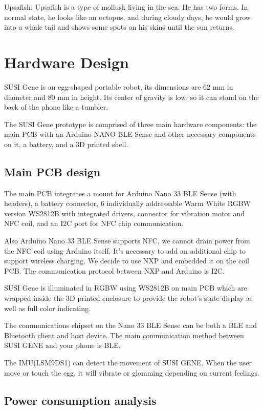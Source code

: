 \documentclass[manuscript,screen]{acmart}
\begin{document}
Upsafish: Upsafish is a type of mollusk living in the sea. He has two forms. In normal state, he looks like an octopus, and during cloudy days, he would grow into a whale tail  and shows some spots on his skins until the sun returns.


\section{Hardware Design}

SUSI Gene is an egg-shaped portable robot, its dimensions are 62 mm in diameter and 80 mm in height. Its center of gravity is low, so it can stand on the back of the phone like a tumbler.

The SUSI Gene prototype is comprised of three main hardware components: the main PCB with an Arduino NANO BLE Sense and other necessary components on it, a battery, and a 3D printed shell.

\subsection{Main PCB design}

The main PCB integrates a mount for Arduino Nano 33 BLE Sense (with headers), a battery connector, 6 individually addressable Warm White RGBW version WS2812B with integrated drivers, connector for vibration motor and NFC coil, and an I2C port for NFC chip communication.

Also Arduino Nano 33 BLE Sense supports NFC, we cannot drain power from the NFC coil using Arduino itself. It's necessary to add an additional chip to support wireless charging. We decide to use NXP and embedded it on the coil PCB. The communication protocol between NXP and Arduino is I2C.

SUSI Gene is illuminated in RGBW using WS2812B on main PCB which are wrapped inside the 3D printed enclosure to provide the robot’s state display as well as full color indicating.

The communications chipset on the Nano 33 BLE Sense can be both a BLE and Bluetooth client and host device. The main communication method between SUSI GENE and your phone is BLE.

The IMU(LSM9DS1) can detect the movement of SUSI GENE. When the user move or touch the egg, it will vibrate or glomming depending on current feelings.

\subsection{Power consumption analysis}
\end{document}
